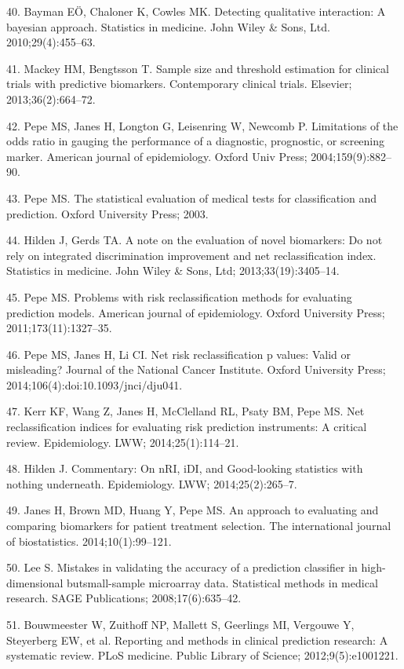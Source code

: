 \documentclass[11pt]{article}
\begin{document}
40. Bayman EÖ, Chaloner K, Cowles MK. Detecting qualitative interaction:
A bayesian approach. Statistics in medicine. John Wiley \& Sons, Ltd.
2010;29(4):455--63.

41. Mackey HM, Bengtsson T. Sample size and threshold estimation for
clinical trials with predictive biomarkers. Contemporary clinical
trials. Elsevier; 2013;36(2):664--72.

42. Pepe MS, Janes H, Longton G, Leisenring W, Newcomb P. Limitations of
the odds ratio in gauging the performance of a diagnostic, prognostic,
or screening marker. American journal of epidemiology. Oxford Univ
Press; 2004;159(9):882--90.

43. Pepe MS. The statistical evaluation of medical tests for
classification and prediction. Oxford University Press; 2003.

44. Hilden J, Gerds TA. A note on the evaluation of novel biomarkers: Do
not rely on integrated discrimination improvement and net
reclassification index. Statistics in medicine. John Wiley \& Sons, Ltd;
2013;33(19):3405--14.

45. Pepe MS. Problems with risk reclassification methods for evaluating
prediction models. American journal of epidemiology. Oxford University
Press; 2011;173(11):1327--35.

46. Pepe MS, Janes H, Li CI. Net risk reclassification p values: Valid
or misleading? Journal of the National Cancer Institute. Oxford
University Press; 2014;106(4):doi:10.1093/jnci/dju041.

47. Kerr KF, Wang Z, Janes H, McClelland RL, Psaty BM, Pepe MS. Net
reclassification indices for evaluating risk prediction instruments: A
critical review. Epidemiology. LWW; 2014;25(1):114--21.

48. Hilden J. Commentary: On nRI, iDI, and Good-looking statistics
with nothing underneath. Epidemiology. LWW; 2014;25(2):265--7.

49. Janes H, Brown MD, Huang Y, Pepe MS. An approach to evaluating and
comparing biomarkers for patient treatment selection. The international
journal of biostatistics. 2014;10(1):99--121.

50. Lee S. Mistakes in validating the accuracy of a prediction
classifier in high-dimensional butsmall-sample microarray data.
Statistical methods in medical research. SAGE Publications;
2008;17(6):635--42.

51. Bouwmeester W, Zuithoff NP, Mallett S, Geerlings MI, Vergouwe Y,
Steyerberg EW, et al. Reporting and methods in clinical prediction
research: A systematic review. PLoS medicine. Public Library of Science;
2012;9(5):e1001221.
\end{document}

